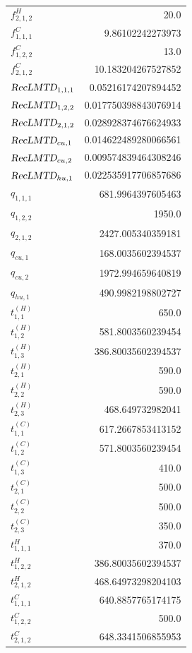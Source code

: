 \documentclass{article}%
\begin{document}
\begin{multicols*}{3}
\begin{supertabular}{lr}
	$f_{2,1,2}^{H}$ & 20.0 \\%
	$f_{1,1,1}^{C}$ & 9.86102242273973 \\%
	$f_{1,2,2}^{C}$ & 13.0 \\%
	$f_{2,1,2}^{C}$ & 10.183204267527852 \\%
	$\textsl{RecLMTD}_{1,1,1}$ & 0.05216174207894452 \\%
	$\textsl{RecLMTD}_{1,2,2}$ & 0.017750398843076914 \\%
	$\textsl{RecLMTD}_{2,1,2}$ & 0.028928374676624933 \\%
	$\textsl{RecLMTD}_{cu,1}$ & 0.014622489280066561 \\%
	$\textsl{RecLMTD}_{cu,2}$ & 0.009574839464308246 \\%
	$\textsl{RecLMTD}_{hu,1}$ & 0.022535917706857686 \\%
	$q_{1,1,1}$ & 681.9964397605463 \\%
	$q_{1,2,2}$ & 1950.0 \\%
	$q_{2,1,2}$ & 2427.005340359181 \\%
	$q_{cu,1}$ & 168.0035602394537 \\%
	$q_{cu,2}$ & 1972.994659640819 \\%
	$q_{hu,1}$ & 490.9982198802727 \\%
	$t_{1,1}^{(H)}$ & 650.0 \\%
	$t_{1,2}^{(H)}$ & 581.8003560239454 \\%
	$t_{1,3}^{(H)}$ & 386.80035602394537 \\%
	$t_{2,1}^{(H)}$ & 590.0 \\%
	$t_{2,2}^{(H)}$ & 590.0 \\%
	$t_{2,3}^{(H)}$ & 468.649732982041 \\%
	$t_{1,1}^{(C)}$ & 617.2667853413152 \\%
	$t_{1,2}^{(C)}$ & 571.8003560239454 \\%
	$t_{1,3}^{(C)}$ & 410.0 \\%
	$t_{2,1}^{(C)}$ & 500.0 \\%
	$t_{2,2}^{(C)}$ & 500.0 \\%
	$t_{2,3}^{(C)}$ & 350.0 \\%
	$t_{1,1,1}^{H}$ & 370.0 \\%
	$t_{1,2,2}^{H}$ & 386.80035602394537 \\%
	$t_{2,1,2}^{H}$ & 468.64973298204103 \\%
	$t_{1,1,1}^{C}$ & 640.8857765174175 \\%
	$t_{1,2,2}^{C}$ & 500.0 \\%
	$t_{2,1,2}^{C}$ & 648.3341506855953 \\%

\end{supertabular}
\end{multicols*}
\end{document}
